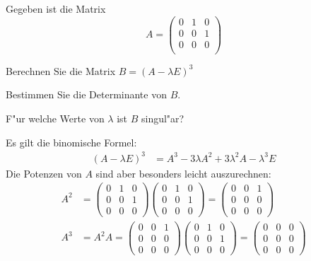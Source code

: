 Gegeben ist die Matrix
\[
A=\begin{pmatrix}
0&1&0\\
0&0&1\\
0&0&0\\
\end{pmatrix}
\]
\begin{teilaufgaben}
\item Berechnen Sie die Matrix $B=(A-\lambda E)^3$
\item Bestimmen Sie die Determinante von $B$.
\item F"ur welche Werte von $\lambda$ ist $B$ singul"ar?
\end{teilaufgaben}

\begin{loesung}
\begin{teilaufgaben}
\item Es gilt die binomische Formel:
\begin{align*}
(A-\lambda E)^3&=A^3-3\lambda A^2+3\lambda^2 A-\lambda^3 E
\end{align*}
Die Potenzen von $A$ sind aber besonders leicht auszurechnen:
\begin{align*}
A^2&=
\begin{pmatrix}
0&1&0\\
0&0&1\\
0&0&0
\end{pmatrix}
\begin{pmatrix}
0&1&0\\
0&0&1\\
0&0&0
\end{pmatrix}
=
\begin{pmatrix}
0&0&1\\
0&0&0\\
0&0&0
\end{pmatrix}
\\
A^3&=A^2A=
\begin{pmatrix}
0&0&1\\
0&0&0\\
0&0&0
\end{pmatrix}
\begin{pmatrix}
0&1&0\\
0&0&1\\
0&0&0
\end{pmatrix}
=\begin{pmatrix}
0&0&0\\
0&0&0\\
0&0&0
\end{pmatrix}
\\
\end{align*}

\end{teilaufgaben}
\end{loesung}
